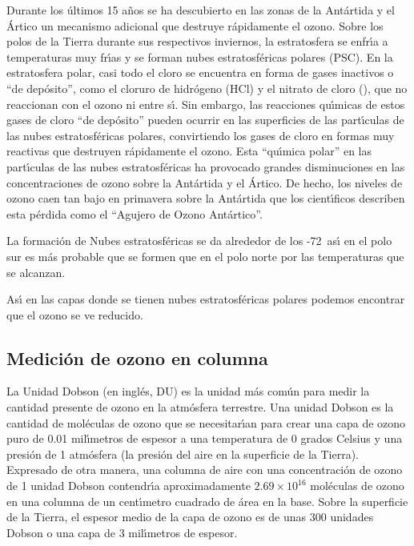 Durante los \'ultimos 15 a\~nos se ha descubierto en las zonas de la Ant\'artida y el \'Artico un mecanismo adicional que destruye r\'apidamente el ozono. Sobre los polos de la Tierra durante sus respectivos inviernos, la estratosfera se enfr\'{\i}a a temperaturas muy fr\'{\i}as y se forman nubes estratosf\'ericas polares (PSC). En la estratosfera polar, casi todo el cloro se encuentra en forma de gases inactivos o ``de dep\'osito'', como el cloruro de hidr\'ogeno (HCl) y el nitrato de cloro (), que no reaccionan con el ozono ni entre s\'{\i}. Sin embargo, las reacciones qu\'{\i}micas de estos gases de cloro ``de dep\'osito''  pueden ocurrir en las superficies de las part\'{\i}culas de las nubes estratosf\'ericas polares, convirtiendo los gases de cloro en formas muy reactivas que destruyen r\'apidamente el ozono. Esta ``qu\'{\i}mica polar'' en las part\'{\i}culas de las nubes estratosf\'ericas ha provocado grandes disminuciones en las concentraciones de ozono sobre la Ant\'artida y el \'Artico. De hecho, los niveles de ozono caen tan bajo en primavera sobre la Ant\'artida que los cient\'{\i}ficos describen esta p\'erdida como el ``Agujero de Ozono Ant\'artico''.

La formaci\'on de Nubes estratosf\'ericas se da alrededor de los -72\celsius\, as\'{\i} en el polo sur es m\'as probable que se formen que en el polo norte por las temperaturas que se alcanzan.

As\'{\i} en las capas donde se tienen nubes estratosf\'ericas polares podemos encontrar que el ozono se ve reducido.

\subsection{Medici\'on de ozono en columna}
La Unidad Dobson (en ingl\'es, DU) es la unidad m\'as com\'un para medir la cantidad presente de ozono en la atm\'osfera terrestre. Una unidad Dobson es la cantidad de mol\'eculas de ozono que se necesitar\'{\i}an para crear una capa de ozono puro de 0.01 mil\'{\i}metros de espesor a una temperatura de 0 grados Celsius y una presi\'on de 1 atm\'osfera (la presi\'on del aire en la superficie de la Tierra). Expresado de otra manera, una columna de aire con una concentraci\'on de ozono de 1 unidad Dobson contendr\'{\i}a aproximadamente $2.69\times10^{16}$ mol\'eculas de ozono en una columna de un cent\'{\i}metro cuadrado de \'area en la base. Sobre la superficie de la Tierra, el espesor medio de la capa de ozono es de unas 300 unidades Dobson o una capa de 3 mil\'{\i}metros de espesor.

